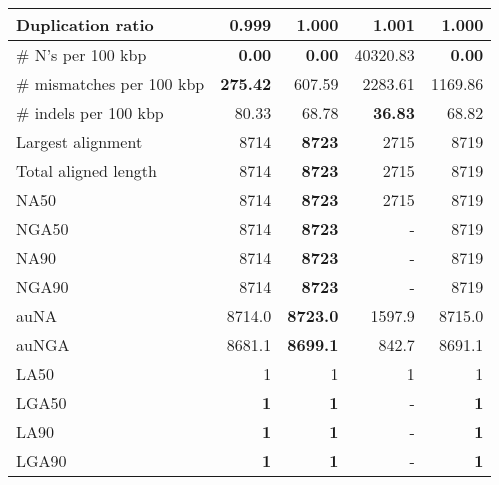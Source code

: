 \documentclass[12pt,a4paper]{article}
\begin{document}
\begin{table}[ht]
\begin{center}
\begin{tabular}{|l*{4}{|r}|}
Duplication ratio & {\bf 0.999} & 1.000 & 1.001 & 1.000 \\ \hline
\# N's per 100 kbp & {\bf 0.00} & {\bf 0.00} & 40320.83 & {\bf 0.00} \\ \hline
\# mismatches per 100 kbp & {\bf 275.42} & 607.59 & 2283.61 & 1169.86 \\ \hline
\# indels per 100 kbp & 80.33 & 68.78 & {\bf 36.83} & 68.82 \\ \hline
Largest alignment & 8714 & {\bf 8723} & 2715 & 8719 \\ \hline
Total aligned length & 8714 & {\bf 8723} & 2715 & 8719 \\ \hline
NA50 & 8714 & {\bf 8723} & 2715 & 8719 \\ \hline
NGA50 & 8714 & {\bf 8723} & - & 8719 \\ \hline
NA90 & 8714 & {\bf 8723} & - & 8719 \\ \hline
NGA90 & 8714 & {\bf 8723} & - & 8719 \\ \hline
auNA & 8714.0 & {\bf 8723.0} & 1597.9 & 8715.0 \\ \hline
auNGA & 8681.1 & {\bf 8699.1} & 842.7 & 8691.1 \\ \hline
LA50 & 1 & 1 & 1 & 1 \\ \hline
LGA50 & {\bf 1} & {\bf 1} & - & {\bf 1} \\ \hline
LA90 & {\bf 1} & {\bf 1} & - & {\bf 1} \\ \hline
LGA90 & {\bf 1} & {\bf 1} & - & {\bf 1} \\ \hline
\end{tabular}
\end{center}
\end{table}
\end{document}
